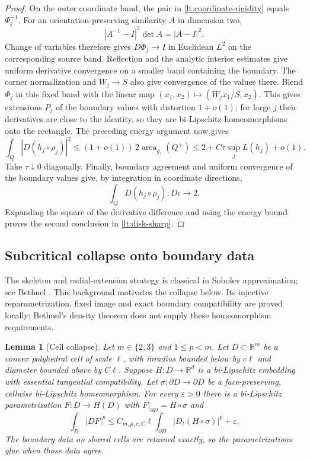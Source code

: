 \documentclass[11pt]{article}
\numberwithin{equation}{section}
\newtheorem{lemma}[theorem]{Lemma}
\theoremstyle{definition}
\theoremstyle{remark}
\begin{document}
\begin{proof}
On the outer coordinate band, the pair in
\eqref{lt:coordinate-rigidity} equals $\Phi_j^{-1}$.  For an
orientation-preserving similarity $A$ in dimension two,
\[
 |A^{-1}-I|^2\det A=|A-I|^2.
\]
Change of variables therefore gives $D\Phi_j\to I$ in Euclidean
$L^2$ on the corresponding source band.  Reflection and the analytic
interior estimates give uniform derivative convergence on a smaller
band containing the boundary.  The corner normalization and $W_j\to S$
also give convergence of the values there.  Blend $\Phi_j$ in this
fixed band with the linear map
$(x_1,x_2)\mapsto(W_jx_1/S,x_2)$.  This gives extensions $P_j$ of the
boundary values with distortion $1+o(1)$; for large $j$ their derivatives
are close to the identity, so they are bi-Lipschitz homeomorphisms onto
the rectangle.  The preceding energy argument now gives
\[
 \int_Q|D(h_j\circ\rho_j)|^2
   \leq(1+o(1))\,2\operatorname{area}_{g_j}(Q^+)
   \leq2+C\tau\sup_jL(h_j)+o(1).
\]
Take $\tau\downarrow0$ diagonally.  Finally, boundary agreement and
uniform convergence of the boundary values give, by integration in
coordinate directions,
\[
 \int_Q D(h_j\circ\rho_j):D\iota\longrightarrow2.
\]
Expanding the square of the derivative difference and using the energy
bound proves the second conclusion in \eqref{lt:disk-sharp}.
\end{proof}

\subsection{Subcritical collapse onto boundary data}

The skeleton and radial-extension strategy is classical in Sobolev
approximation; see Bethuel \cite[Section~II.1, pp.~164--165, and
Section~II.3, Eqs.~(32), (37), pp.~170--171]{Bethuel1991}.
This background motivates the collapse below.  Its injective
reparametrization, fixed image and exact boundary compatibility are
proved locally; Bethuel's density theorem does not supply these
homeomorphism requirements.

\begin{lemma}[Cell collapse]
\label{lt:collapse}
Let $m\in\{2,3\}$ and $1\leq p<m$.  Let $D\subset\mathbb R^m$ be a
convex polyhedral cell of scale $\ell$, with inradius bounded below by
$c\ell$ and diameter bounded above by $C\ell$.  Suppose
$H:D\to\mathbb R^d$ is a bi-Lipschitz embedding with essential tangential
compatibility.  Let $\sigma:\partial D\to\partial D$ be a
face-preserving, cellwise bi-Lipschitz homeomorphism.  For every
$\varepsilon>0$ there is a bi-Lipschitz parametrization $F:D\to H(D)$ with
$F|_{\partial D}=H\circ\sigma$ and
\begin{equation}
 \int_D|DF|^p
       \leq C_{m,p,c,C}\ell
                    \int_{\partial D}|D_t(H\circ\sigma)|^p+\varepsilon.
 \label{lt:collapse-estimate}
\end{equation}
The boundary data on shared cells are retained exactly, so the
parametrizations glue when those data agree.
\end{lemma}
\end{document}
